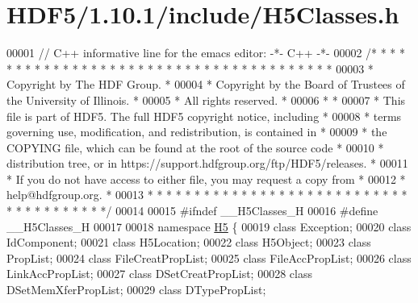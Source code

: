 \hypertarget{_h_d_f5_21_810_81_2include_2_h5_classes_8h_source}{}\section{H\+D\+F5/1.10.1/include/\+H5\+Classes.h}
\label{_h_d_f5_21_810_81_2include_2_h5_classes_8h_source}

\begin{DoxyCode}
00001 \textcolor{comment}{// C++ informative line for the emacs editor: -*- C++ -*-}
00002 \textcolor{comment}{/* * * * * * * * * * * * * * * * * * * * * * * * * * * * * * * * * * * * * * *}
00003 \textcolor{comment}{ * Copyright by The HDF Group.                                               *}
00004 \textcolor{comment}{ * Copyright by the Board of Trustees of the University of Illinois.         *}
00005 \textcolor{comment}{ * All rights reserved.                                                      *}
00006 \textcolor{comment}{ *                                                                           *}
00007 \textcolor{comment}{ * This file is part of HDF5.  The full HDF5 copyright notice, including     *}
00008 \textcolor{comment}{ * terms governing use, modification, and redistribution, is contained in    *}
00009 \textcolor{comment}{ * the COPYING file, which can be found at the root of the source code       *}
00010 \textcolor{comment}{ * distribution tree, or in https://support.hdfgroup.org/ftp/HDF5/releases.  *}
00011 \textcolor{comment}{ * If you do not have access to either file, you may request a copy from     *}
00012 \textcolor{comment}{ * help@hdfgroup.org.                                                        *}
00013 \textcolor{comment}{ * * * * * * * * * * * * * * * * * * * * * * * * * * * * * * * * * * * * * * */}
00014 
00015 \textcolor{preprocessor}{#ifndef \_\_H5Classes\_H}
00016 \textcolor{preprocessor}{#define \_\_H5Classes\_H}
00017 
00018 \textcolor{keyword}{namespace }\hyperlink{namespace_h5}{H5} \{
00019         \textcolor{keyword}{class }Exception;
00020         \textcolor{keyword}{class }IdComponent;
00021         \textcolor{keyword}{class }H5Location;
00022         \textcolor{keyword}{class }H5Object;
00023         \textcolor{keyword}{class }PropList;
00024         \textcolor{keyword}{class }FileCreatPropList;
00025         \textcolor{keyword}{class }FileAccPropList;
00026         \textcolor{keyword}{class }LinkAccPropList;
00027         \textcolor{keyword}{class }DSetCreatPropList;
00028         \textcolor{keyword}{class }DSetMemXferPropList;
00029         \textcolor{keyword}{class }DTypePropList;

\end{DoxyCode}
